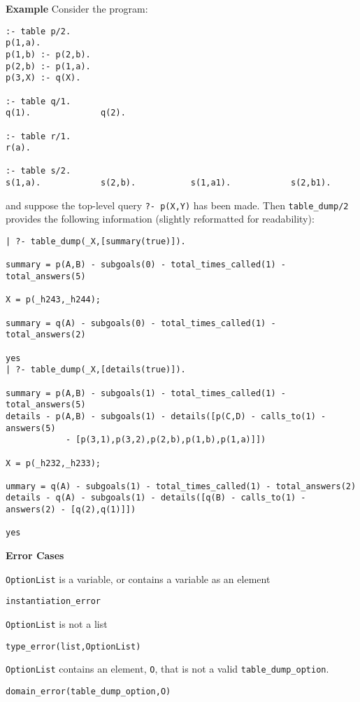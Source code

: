 \begin{description}
{\bf Example}  Consider the program:
\begin{verbatim}
:- table p/2.
p(1,a).
p(1,b) :- p(2,b).
p(2,b) :- p(1,a).
p(3,X) :- q(X).

:- table q/1.
q(1).              q(2).

:- table r/1.
r(a).

:- table s/2.
s(1,a).            s(2,b).           s(1,a1).            s(2,b1).
\end{verbatim}
and suppose the top-level query {\tt ?- p(X,Y)} has been made.  Then
{\tt table\_dump/2} provides the following information (slightly
reformatted for readability):
%
\begin{verbatim}
| ?- table_dump(_X,[summary(true)]).

summary = p(A,B) - subgoals(0) - total_times_called(1) - total_answers(5)

X = p(_h243,_h244);

summary = q(A) - subgoals(0) - total_times_called(1) - total_answers(2)

yes
| ?- table_dump(_X,[details(true)]).

summary = p(A,B) - subgoals(1) - total_times_called(1) - total_answers(5)
details - p(A,B) - subgoals(1) - details([p(C,D) - calls_to(1) - answers(5) 
            - [p(3,1),p(3,2),p(2,b),p(1,b),p(1,a)]])

X = p(_h232,_h233);

ummary = q(A) - subgoals(1) - total_times_called(1) - total_answers(2)
details - q(A) - subgoals(1) - details([q(B) - calls_to(1) - answers(2) - [q(2),q(1)]])

yes
\end{verbatim}

{\bf Error Cases}
\bi
\item {\tt OptionList} is a variable, or contains a variable as an element
\bi
\item {\tt instantiation\_error}
\ei
\item {\tt OptionList} is not a list
\bi
\item {\tt type\_error(list,OptionList)}
\ei
\item {\tt OptionList} contains an element, {\tt O}, that is not a
  valid {\tt table\_dump\_option}.
\bi
\item {\tt domain\_error(table\_dump\_option,O)}
\ei
\ei



\end{description}
